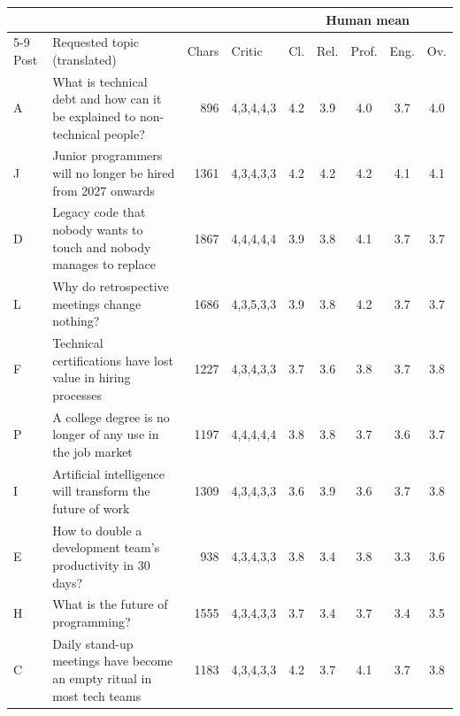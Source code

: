 \begin{tabular}{lp{6.2cm}rlccccc}
\toprule
 & & & & \multicolumn{5}{c}{Human mean} \\
\cmidrule(lr){5-9}
Post & Requested topic (translated) & Chars & Critic & Cl. & Rel. & Prof. & Eng. & Ov. \\
\midrule
A & What is technical debt and how can it be explained to non-technical people? & 896 & 4,3,4,4,3 & 4.2 & 3.9 & 4.0 & 3.7 & 4.0 \\
J & Junior programmers will no longer be hired from 2027 onwards & 1361 & 4,3,4,3,3 & 4.2 & 4.2 & 4.2 & 4.1 & 4.1 \\
D & Legacy code that nobody wants to touch and nobody manages to replace & 1867 & 4,4,4,4,4 & 3.9 & 3.8 & 4.1 & 3.7 & 3.7 \\
L & Why do retrospective meetings change nothing? & 1686 & 4,3,5,3,3 & 3.9 & 3.8 & 4.2 & 3.7 & 3.7 \\
F & Technical certifications have lost value in hiring processes & 1227 & 4,3,4,3,3 & 3.7 & 3.6 & 3.8 & 3.7 & 3.8 \\
P & A college degree is no longer of any use in the job market & 1197 & 4,4,4,4,4 & 3.8 & 3.8 & 3.7 & 3.6 & 3.7 \\
I & Artificial intelligence will transform the future of work & 1309 & 4,3,4,3,3 & 3.6 & 3.9 & 3.6 & 3.7 & 3.8 \\
E & How to double a development team's productivity in 30 days? & 938 & 4,3,4,3,3 & 3.8 & 3.4 & 3.8 & 3.3 & 3.6 \\
H & What is the future of programming? & 1555 & 4,3,4,3,3 & 3.7 & 3.4 & 3.7 & 3.4 & 3.5 \\
C & Daily stand-up meetings have become an empty ritual in most tech teams & 1183 & 4,3,4,3,3 & 4.2 & 3.7 & 4.1 & 3.7 & 3.8 \\
\bottomrule
\end{tabular}
